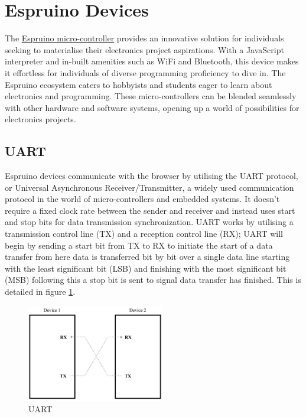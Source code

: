 \documentclass{l4proj}
\begin{document}
\section{Espruino Devices}
\text 
The \href{https://www.espruino.com/}{Espruino micro-controller} provides an innovative solution for individuals seeking to materialise their electronics project aspirations. With a JavaScript interpreter and in-built amenities such as WiFi and Bluetooth, this device makes it effortless for individuals of diverse programming proficiency to dive in. The Espruino ecosystem caters to hobbyists and students eager to learn about electronics and programming. These micro-controllers can be blended seamlessly with other hardware and software systems, opening up a world of possibilities for electronics projects.

    
\subsection{UART}
\text Espruino devices communicate with the browser by utilising the UART protocol, or Universal Asynchronous Receiver/Transmitter, a widely used communication protocol in the world of micro-controllers and embedded systems. It doesn't require a fixed clock rate between the sender and receiver and instead uses start and stop bits for data transmission synchronization. UART works by utilising a transmission control line (TX) and a reception control line (RX); UART will begin by sending a start bit from TX to RX to initiate the start of a data transfer from here data is transferred bit by bit over a single data line starting with the least significant bit (LSB) and finishing with the most significant bit (MSB) following this a stop bit is sent to signal data transfer has finished. This is detailed in figure \ref{fig:UART}.

\begin{figure}[!ht]
\begin{center}
    \includegraphics[width=60mm,scale=0.5]{dissertation/images/UART_diagram.png}
\end{center}
\caption{UART}
    \label{fig:UART}
\end{figure}
\end{document}
